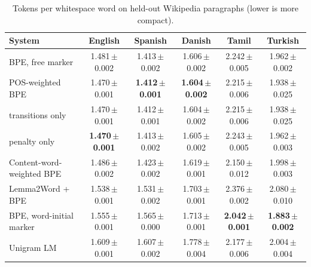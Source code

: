 \begin{table}[!ht]
\centering
\caption{Tokens per whitespace word on held-out Wikipedia paragraphs (lower is more compact).}
\label{tab:tpw}
\small
\setlength{\tabcolsep}{4pt}
\begin{tabular}{lccccc}
\toprule
System & English & Spanish & Danish & Tamil & Turkish \\
\midrule
BPE, free marker & 1.481\,{\scriptsize$\pm$0.002} & 1.413\,{\scriptsize$\pm$0.002} & 1.606\,{\scriptsize$\pm$0.002} & 2.242\,{\scriptsize$\pm$0.005} & 1.962\,{\scriptsize$\pm$0.002} \\
POS-weighted BPE & 1.470\,{\scriptsize$\pm$0.001} & \textbf{1.412\,{\scriptsize$\pm$0.001}} & \textbf{1.604\,{\scriptsize$\pm$0.002}} & 2.215\,{\scriptsize$\pm$0.006} & 1.938\,{\scriptsize$\pm$0.025} \\
\quad transitions only & 1.470\,{\scriptsize$\pm$0.001} & 1.412\,{\scriptsize$\pm$0.001} & 1.604\,{\scriptsize$\pm$0.002} & 2.215\,{\scriptsize$\pm$0.006} & 1.938\,{\scriptsize$\pm$0.025} \\
\quad penalty only & \textbf{1.470\,{\scriptsize$\pm$0.001}} & 1.413\,{\scriptsize$\pm$0.002} & 1.605\,{\scriptsize$\pm$0.002} & 2.243\,{\scriptsize$\pm$0.005} & 1.962\,{\scriptsize$\pm$0.003} \\
\addlinespace[2pt]
Content-word-weighted BPE & 1.486\,{\scriptsize$\pm$0.002} & 1.423\,{\scriptsize$\pm$0.002} & 1.619\,{\scriptsize$\pm$0.001} & 2.150\,{\scriptsize$\pm$0.012} & 1.998\,{\scriptsize$\pm$0.003} \\
Lemma2Word + BPE & 1.538\,{\scriptsize$\pm$0.001} & 1.531\,{\scriptsize$\pm$0.002} & 1.703\,{\scriptsize$\pm$0.001} & 2.376\,{\scriptsize$\pm$0.002} & 2.080\,{\scriptsize$\pm$0.010} \\
BPE, word-initial marker & 1.555\,{\scriptsize$\pm$0.001} & 1.565\,{\scriptsize$\pm$0.000} & 1.713\,{\scriptsize$\pm$0.001} & \textbf{2.042\,{\scriptsize$\pm$0.001}} & \textbf{1.883\,{\scriptsize$\pm$0.002}} \\
Unigram LM & 1.609\,{\scriptsize$\pm$0.001} & 1.607\,{\scriptsize$\pm$0.002} & 1.778\,{\scriptsize$\pm$0.004} & 2.177\,{\scriptsize$\pm$0.006} & 2.004\,{\scriptsize$\pm$0.004} \\
\bottomrule
\end{tabular}
\end{table}
